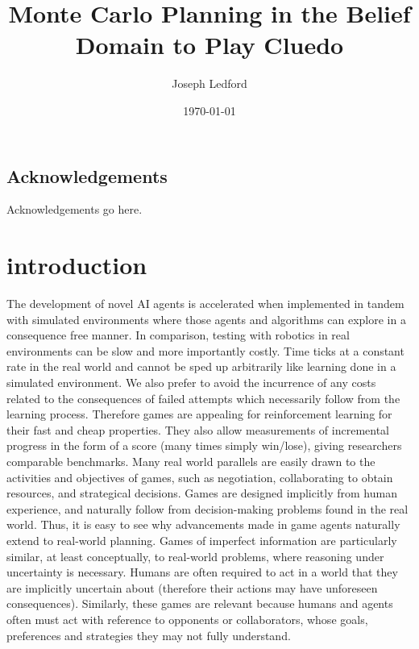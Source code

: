 \documentclass[msc, deptreport, ai, romanprepages]{infthesis}
\begin{document}
\title{Monte Carlo Planning in the Belief Domain to Play Cluedo}

\author{Joseph Ledford}


\date{\today}


\maketitle

\section*{Acknowledgements}
Acknowledgements go here. 

\tableofcontents

\chapter{introduction}
The development of novel AI agents is accelerated when implemented in tandem with simulated environments where those agents and algorithms can explore in a consequence free manner. In comparison, testing with robotics in real environments can be slow and more importantly costly. Time ticks at a constant rate in the real world and cannot be sped up arbitrarily like learning done in a simulated environment. We also prefer to avoid the incurrence of any costs related to the consequences of failed attempts which necessarily follow from the learning process. Therefore games are appealing for reinforcement learning for their fast and cheap properties. They also allow measurements of incremental progress in the form of a score (many times simply win/lose), giving researchers comparable benchmarks. Many real world parallels are easily drawn to the activities and objectives of games, such as negotiation, collaborating to obtain resources, and strategical decisions. Games are designed implicitly from human experience, and naturally follow from decision-making problems found in the real world. Thus, it is easy to see why advancements made in game agents naturally extend to real-world planning. Games of imperfect information are particularly similar, at least conceptually, to real-world problems, where reasoning under uncertainty is necessary. Humans are often required to act in a world that they are implicitly uncertain about (therefore their actions may have unforeseen consequences). Similarly, these games are relevant because humans and agents often must act with reference to opponents or collaborators, whose goals, preferences and strategies they may not fully understand. 
\end{document}
